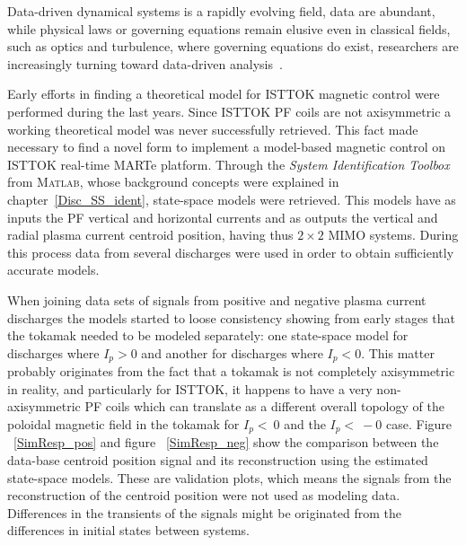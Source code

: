 Data-driven dynamical systems is a rapidly evolving field, data are abundant, while physical laws or governing equations remain elusive even in classical fields, such as optics and turbulence, where governing equations do exist, researchers are increasingly turning toward data-driven analysis~\cite[Chapter~7]{DataDriven2019}.\smallskip

Early efforts in finding a theoretical model for ISTTOK magnetic control were performed during  the last years. Since ISTTOK PF coils are not axisymmetric a working theoretical model  was never successfully retrieved. This fact made necessary to find a novel form to implement a model-based magnetic control on ISTTOK real-time MARTe platform.   Through  the \textit{System Identification Toolbox} from \textsc{Matlab}, whose background concepts were explained in chapter~\ref{Disc_SS_ident}, state-space models were retrieved. This models have as inputs the PF vertical and horizontal currents and as outputs the vertical and radial plasma current centroid position, having thus  $2\times 2$ MIMO systems. During this process data from several discharges were used in order to obtain  sufficiently  accurate models.\smallskip

 When joining data sets of signals from  positive and negative plasma current discharges  the models started to loose consistency showing from early stages that the tokamak needed to be modeled separately: one state-space model for discharges where $I_p > 0$ and another for discharges where $I_p<0$. This matter probably originates from the fact that a  tokamak is not completely axisymmetric in reality, and particularly for ISTTOK, it happens to have a very non-axisymmetric PF coils which can translate as a different overall topology of the poloidal magnetic field in the tokamak for $I_p<~0$ and the  $I_p<~-0$ case. Figure ~\ref{SimResp_pos} and figure ~\ref{SimResp_neg} show the comparison between  the data-base centroid position signal and its reconstruction using the estimated state-space models. These are validation plots, which means the signals from the reconstruction of the centroid position were not used as modeling data. Differences in the transients of the signals might be originated from the differences in initial states between systems.\smallskip



